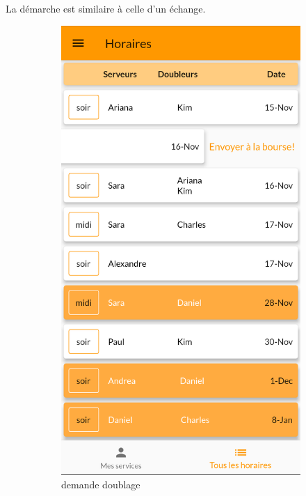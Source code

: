         La démarche est similaire à celle d'un échange.

        \begin{figure}[!h]
            \centering
            \begin{subfigure}{.3\textwidth}
                \centering
                \includegraphics[width=0.9\linewidth]{screenshots/scenario_07/horaire_doublage.png}
                \caption{demande doublage}
                \label{fig:ask_doublage}
            \end{subfigure}
            \begin{subfigure}{.3\textwidth}

\end{subfigure}
\end{figure}
